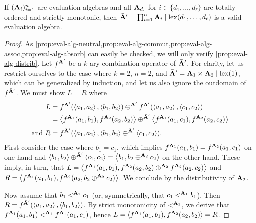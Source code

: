 \begin{lemma}[Validity]
    If \((\mathbf{A}_i)_{i=1}^n\) are evaluation algebras
    and all \(\mathbf{A}_{d_i}\) for \(i \in \{d_1, \ldots, d_\ell\}\)
    are totally ordered and strictly monotonic,
    then \(\bar{\mathbf{A}}' = \prod_{i=1}^n \mathbf{A}_i \mid \mathrm{lex}(d_1, \ldots, d_\ell)\)
    is a valid evaluation algebra.
\end{lemma}
\begin{proof}
    As \cref{prop:eval-alg-neutral,prop:eval-alg-commut,prop:eval-alg-assoc,prop:eval-alg-absorb} can easily be checked, we will only verify \cref{prop:eval-alg-distrib}.
    Let \(f^{\bar{\mathbf{A}}'}\) be a \(k\)-ary combination operator of \(\bar{\mathbf{A}}'\).
    For clarity, let us restrict ourselves to the case where \(k = 2\), \(n = 2\), and \(\bar{\mathbf{A}}' = \mathbf{A}_1 \times \mathbf{A}_2 \mid \mathrm{lex}(1)\), which can be generalized by induction, and let us also ignore the outdomain of \(f^{\bar{\mathbf{A}}'}\).
    We must show \(L = R\) where
    \begin{align*}
        L &= f^{\bar{\mathbf{A}}'}(\left\langle a_1, a_2\right\rangle, \left\langle b_1, b_2\right\rangle) \mathbin{\mathbin{\oplus}^{\bar{\mathbf{A}}'}} f^{\bar{\mathbf{A}}'}(\left\langle a_1, a_2\right\rangle, \left\langle c_1, c_2\right\rangle) \\
          &= \left\langle f^{\mathbf{A}_1}(a_1, b_1), f^{\mathbf{A}_2}(a_2, b_2)\right\rangle \mathbin{\mathbin{\oplus}^{\bar{\mathbf{A}}'}} \left\langle f^{\mathbf{A}_1}(a_1, c_1), f^{\mathbf{A}_2}(a_2, c_2)\right\rangle \\[.5ex]
        \text{and } R &= f^{\bar{\mathbf{A}}'}(\left\langle a_1, a_2\right\rangle, \left\langle b_1, b_2\right\rangle \mathbin{\mathbin{\oplus}^{\bar{\mathbf{A}}'}} \left\langle c_1, c_2\right\rangle).
    \end{align*}
    First consider the case where \(b_1 = c_1\), which implies
    \(f^{\mathbf{A}_1}(a_1, b_1) = f^{\mathbf{A}_2}(a_1, c_1)\) on one hand
    and \(\left\langle b_1, b_2\right\rangle \mathbin{\mathbin{\oplus}^{\bar{\mathbf{A}}'}} \left\langle c_1, c_2\right\rangle = \left\langle b_1, b_2 \mathbin{\oplus}^{\mathbf{A}_2} c_2\right\rangle\)
    on the other hand.
    These imply, in turn, that \(L = \left\langle f^{\mathbf{A}_1}(a_1, b_1), f^{\mathbf{A}_2}(a_2, b_2) \mathbin{\mathbin{\oplus}^{\mathbf{A}_2}} f^{\mathbf{A}_2}(a_2, c_2)\right\rangle\)
    and \(R = \left\langle f^{\mathbf{A}_1}(a_1, b_1), f^{\mathbf{A}_2}(a_2, b_2 \mathbin{\oplus}^{\mathbf{A}_2} c_2)\right\rangle\).
    We conclude by the distributivity of \(\mathbf{A}_2\).

    Now assume that \(b_1 \mathrel{<^{\mathbf{A}_1}} c_1\) (or, symmetrically, that \(c_1 \mathrel{<^{\mathbf{A}_1}} b_1\)).
    Then \(R = f^{\bar{\mathbf{A}}'}(\left\langle a_1, a_2\right\rangle, \left\langle b_1, b_2\right\rangle)\).
    By strict monotonicity of \(<^{\mathbf{A}_1}\), we derive that \(f^{\mathbf{A}_1}(a_1, b_1) \mathrel{<^{\mathbf{A}_1}} f^{\mathbf{A}_1}(a_1, c_1)\), hence \(L = \langle f^{\mathbf{A}_1}(a_1, b_1),\allowbreak f^{\mathbf{A}_2}(a_2, b_2) \rangle = R\).
\end{proof}

